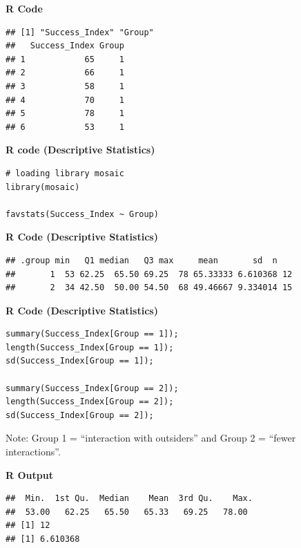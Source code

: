 \begin{example}
\noindent\textbf{R Code}
\begin{tcolorbox}[colback=gray!10, colframe=black!45, arc=2mm,
  before skip=4pt, after skip=4pt]
\begin{verbatim}
## [1] "Success_Index" "Group"
##   Success_Index Group
## 1            65     1
## 2            66     1
## 3            58     1
## 4            70     1
## 5            78     1
## 6            53     1
\end{verbatim}
\end{tcolorbox}
\noindent\textbf{R code (Descriptive Statistics)}
\begin{tcolorbox}[colback=gray!10, colframe=black!45, arc=2mm,
  before skip=4pt, after skip=4pt]
\begin{verbatim}
# loading library mosaic
library(mosaic)

favstats(Success_Index ~ Group)
\end{verbatim}
\end{tcolorbox}

\noindent\textbf{R Code (Descriptive Statistics)}
\begin{tcolorbox}[colback=gray!10, colframe=black!45, arc=2mm,
  before skip=4pt, after skip=4pt]
\begin{verbatim}
## .group min   Q1 median   Q3 max     mean       sd  n
##       1  53 62.25  65.50 69.25  78 65.33333 6.610368 12
##       2  34 42.50  50.00 54.50  68 49.46667 9.334014 15
\end{verbatim}
\end{tcolorbox}

\noindent\textbf{R Code (Descriptive Statistics)}
\begin{tcolorbox}[colback=gray!10, colframe=black!45, arc=2mm,
  before skip=4pt, after skip=4pt]
\begin{verbatim}
summary(Success_Index[Group == 1]);
length(Success_Index[Group == 1]);
sd(Success_Index[Group == 1]);

summary(Success_Index[Group == 2]);
length(Success_Index[Group == 2]);
sd(Success_Index[Group == 2]);
\end{verbatim}
\end{tcolorbox}

Note: Group 1 = “interaction with outsiders” and Group 2 = “fewer interactions”.

\noindent\textbf{R Output}
\begin{tcolorbox}[colback=gray!10, colframe=black!45, arc=2mm,
  before skip=4pt, after skip=4pt]
\begin{verbatim}
##  Min.  1st Qu.  Median    Mean  3rd Qu.    Max. 
##  53.00   62.25   65.50   65.33   69.25   78.00 
## [1] 12
## [1] 6.610368


\end{verbatim}
\end{tcolorbox}
\end{example}
